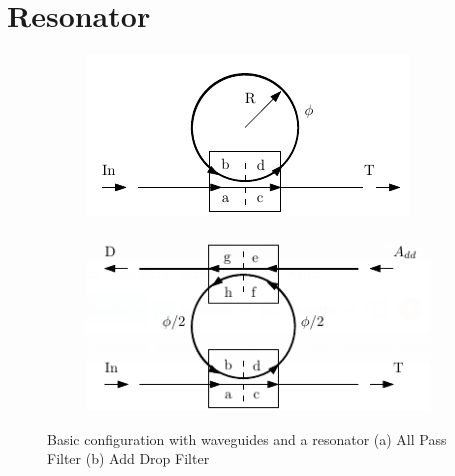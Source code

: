 \section{Resonator}
\begin{figure}
\centering
\begin{subfigure}{0.5\textwidth}
\centering
\includegraphics[width = \textwidth]{img/APF}
\caption{}
\end{subfigure}%
\begin{subfigure}{0.5\textwidth}
\includegraphics[width = \textwidth]{img/ADF}
\caption{}
\end{subfigure}
\caption{Basic configuration with waveguides and a resonator (a) All Pass Filter (b) Add Drop Filter}\label{basicconfiguration}
\end{figure}

